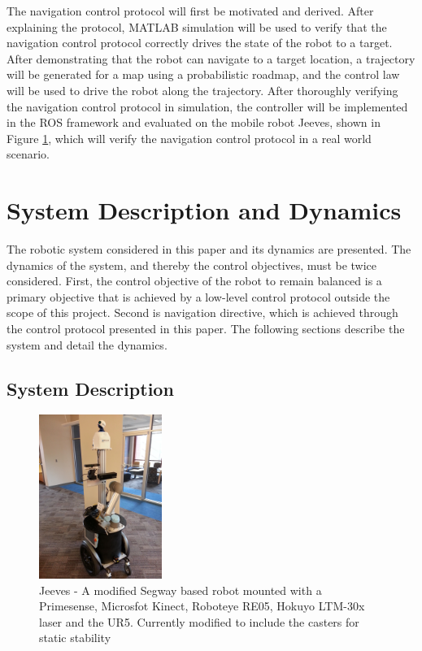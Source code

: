 \documentclass[journal]{IEEEtran}
\begin{document}
The navigation control protocol will first be motivated and derived. After explaining the protocol, MATLAB simulation will be used to verify that the navigation control protocol correctly drives the state of the robot to a target. After demonstrating that the robot can navigate to a target location, a trajectory will be generated for a map using a probabilistic roadmap, and the control law will be used to drive the robot along the trajectory. After thoroughly verifying the navigation control protocol in simulation, the controller will be implemented in the ROS framework and evaluated on the mobile robot Jeeves, shown in Figure \ref{fig:jeeves}, which will verify the navigation control protocol in a real world scenario.

\section{System Description and Dynamics}
The robotic system considered in this paper and its dynamics are presented. The dynamics of the system, and thereby the control objectives, must be twice considered. First, the control objective of the robot to remain balanced is a primary objective that is achieved by a low-level control protocol outside the scope of this project. Second is navigation directive, which is achieved through the control protocol presented in this paper. The following sections describe the system and detail the dynamics.
   
\subsection{System Description}
\begin{figure}
    \centering
    \includegraphics[width = 4cm, scale=0.2]{jeeves2_0.jpg}
    \caption{Jeeves - A modified Segway based robot mounted with a Primesense, Microsfot Kinect, Roboteye RE05, Hokuyo LTM-30x laser and the UR5. Currently modified to include the casters for static stability}
    \label{fig:jeeves}
\end{figure}
\end{document}
